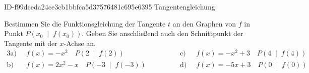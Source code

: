 \begin{exercise}
      {ID-f99dceda24ce3cb1bbfca5d37576481c695e6395}
      {Tangentengleichung}
  \ifproblem\problem\par
    Bestimmen Sie die Funktionsgleichung der
    Tangente $t$ an den Graphen von $f$ in
    Punkt $P\left(x_0\;\middle|\;f(x_0)\right)$.
    Geben Sie anschließend auch den Schnittpunkt
    der Tangente mit der $x$-Achse an.
    \begin{alignat*}{3}
      \text{a)}&\;\;
      f(x)=-x^2
      \quad
      P\left(2\;\middle|\;f(2)\right)
      \qquad&\qquad
      \text{c)}&\;\;
      f(x)=-x^2+3
      \quad
      P\left(4\;\middle|\;f(4)\right)
      \\[1ex]
      \text{b)}&\;\;
      f(x)=2x^2-x
      \quad
      P\left(-3\;\middle|\;f(-3)\right)
      \qquad&\qquad
      \text{d)}&\;\;
      f(x)=-5x+3
      \quad
      P\left(0\;\middle|\;f(0)\right)
    \end{alignat*}
  \fi
\end{exercise}
